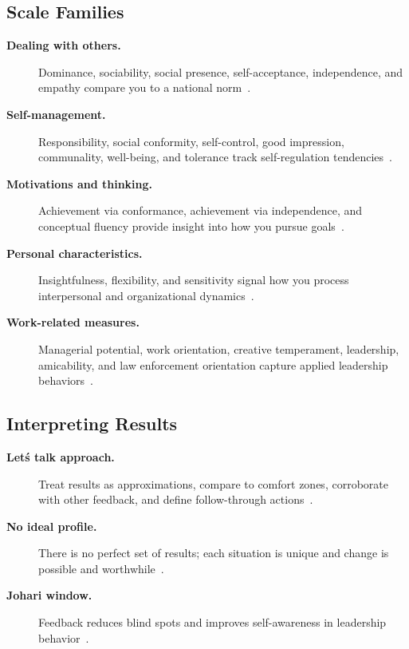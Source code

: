 \documentclass[../main.tex]{subfiles}
\begin{document}
\subsection{Scale Families}
\begin{description}
  \item[\textbf{Dealing with others.}] Dominance, sociability, social presence, self-acceptance, independence, and empathy compare you to a national norm~\autocite{edo-5-1-9-cpi-260-2025}.
  \item[\textbf{Self-management.}] Responsibility, social conformity, self-control, good impression, communality, well-being, and tolerance track self-regulation tendencies~\autocite{edo-5-1-9-cpi-260-2025}.
  \item[\textbf{Motivations and thinking.}] Achievement via conformance, achievement via independence, and conceptual fluency provide insight into how you pursue goals~\autocite{edo-5-1-9-cpi-260-2025}.
  \item[\textbf{Personal characteristics.}] Insightfulness, flexibility, and sensitivity signal how you process interpersonal and organizational dynamics~\autocite{edo-5-1-9-cpi-260-2025}.
  \item[\textbf{Work-related measures.}] Managerial potential, work orientation, creative temperament, leadership, amicability, and law enforcement orientation capture applied leadership behaviors~\autocite{edo-5-1-9-cpi-260-2025}.
\end{description}

\subsection{Interpreting Results}
\begin{description}
  \item[\textbf{Let\'s talk approach.}] Treat results as approximations, compare to comfort zones, corroborate with other feedback, and define follow-through actions~\autocite{edo-5-1-9-cpi-260-2025}.
  \item[\textbf{No ideal profile.}] There is no perfect set of results; each situation is unique and change is possible and worthwhile~\autocite{edo-5-1-9-cpi-260-2025}.
  \item[\textbf{Johari window.}] Feedback reduces blind spots and improves self-awareness in leadership behavior~\autocite{edo-5-1-9-cpi-260-2025}.
\end{description}
\end{document}
